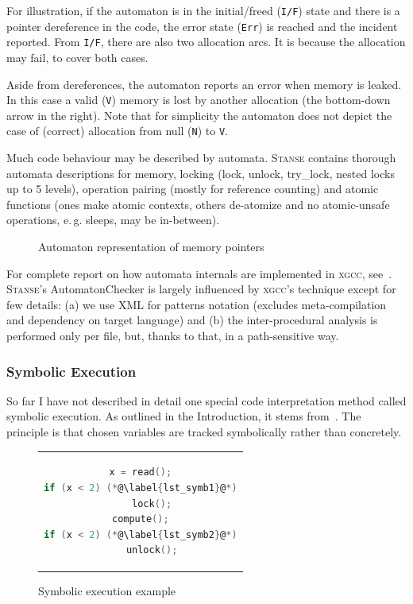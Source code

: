 \documentclass[11pt,a4paper]{article}
\newcommand{\stan}{\textsc{Stanse}\xspace}
\begin{document}
For illustration, if the automaton is in the initial/freed (\texttt{I/F})
state and there is a pointer dereference in the code, the error state
(\texttt{Err}) is reached and the incident reported. From \texttt{I/F}, there
are also two allocation arcs. It is because the allocation may fail, to cover
both cases.

Aside from dereferences, the automaton reports an error when memory is leaked.
In this case a valid (\texttt{V}) memory is lost by another allocation (the
bottom-down arrow in the right). Note that for simplicity the automaton does
not depict the case of (correct) allocation from null (\texttt{N}) to
\texttt{V}.

Much code behaviour may be described by automata. \stan contains thorough
automata descriptions for memory, locking (lock, unlock, try\_lock, nested
locks up to 5 levels), operation pairing (mostly for reference counting) and
atomic functions (ones make atomic contexts, others de-atomize and no
atomic-unsafe operations, e.\,g. sleeps, may be in-between).

\begin{figure}[htb]
\begin{center}

\end{center}
\caption{Automaton representation of memory pointers}
\label{fig.auto_mem}
\end{figure}

For complete report on how automata internals are implemented in
\textsc{xgcc}, see~\cite{metal}. \stan's AutomatonChecker is largely
influenced by \textsc{xgcc}'s technique except for few details: (a) we use XML
for patterns notation (excludes meta-compilation and dependency on target
language) and (b) the inter-procedural analysis is performed only per file,
but, thanks to that, in a path-sensitive way.

\subsubsection{Symbolic Execution}
\label{current-se}
So far I have not described in detail one special code interpretation method
called symbolic execution. As outlined in the Introduction, it stems
from~\cite{select}. The principle is that chosen variables are tracked
symbolically rather than concretely.

\begin{figure}[htb]
\begin{center}
\begin{tabular}{c} %
\begin{lstlisting}[language=C]
x = read();
if (x < 2) (*@\label{lst_symb1}@*)
	lock();
compute();
if (x < 2) (*@\label{lst_symb2}@*)
	unlock();
\end{lstlisting}
\end{tabular}
\caption{Symbolic execution example}
\label{fig.symbolic}
\end{center}
\end{figure}
\end{document}
